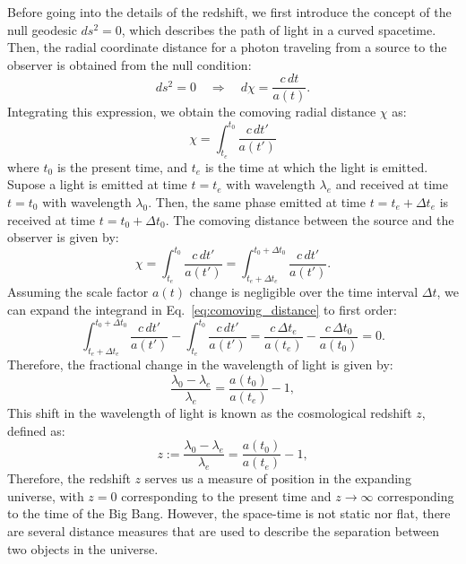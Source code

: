Before going into the details of the redshift, we first introduce the concept of the null geodesic $ds^2 = 0$, which describes the path of light in a curved spacetime. Then, the radial coordinate distance for a photon traveling from a source to the observer is obtained from the null condition:
\begin{equation}
    ds^2 = 0 \quad \Rightarrow \quad d\chi = \frac{c \, dt}{a(t)}.
    \label{eq:null_geodesic_condition}
\end{equation}
Integrating this expression, we obtain the comoving radial distance \( \chi \) as:
\begin{equation}
    \chi = \int_{t_e}^{t_0} \frac{c \, dt'}{a(t')}
    \label{eq:comoving_radial_distance}
\end{equation}
where \( t_0 \) is the present time, and \( t_e \) is the time at which the light is emitted. Supose a light is emitted at time \( t = t_e \) with wavelength \( \lambda_e \) and received at time \( t = t_0 \) with wavelength \( \lambda_0 \). Then, the same phase emitted at time \( t = t_e + \Delta t_e \) is received at time \( t = t_0 + \Delta t_0 \).
The comoving distance between the source and the observer is given by:
\begin{equation}
    \chi = \int_{t_e}^{t_0} \frac{c \, dt'}{a(t')} = \int_{t_e + \Delta t_e}^{t_0 + \Delta t_0} \frac{c \, dt'}{a(t')}.
    \label{eq:comoving_distance}
\end{equation}
Assuming the scale factor \( a(t) \) change is negligible over the time interval \( \Delta t \), we can expand the integrand in Eq.~\eqref{eq:comoving_distance} to first order:
\begin{equation}
    \int_{t_e + \Delta t_e}^{t_0 + \Delta t_0} \frac{c \, dt'}{a(t')} - \int_{t_e}^{t_0} \frac{c \, dt'}{a(t')} = \frac{c \, \Delta t_e}{a(t_e)} - \frac{c \, \Delta t_0}{a(t_0)} = 0.
\end{equation}
Therefore, the fractional change in the wavelength of light is given by:
\begin{equation}
    \frac{\lambda_0 - \lambda_e}{\lambda_e} = \frac{a(t_0)}{a(t_e)} - 1,
    \label{eq:redshift_definition}
\end{equation}
This shift in the wavelength of light is known as the cosmological redshift \( z \), defined as:
\begin{equation}
    z := \frac{\lambda_0 - \lambda_e}{\lambda_e} = \frac{a(t_0)}{a(t_e)} - 1,
    \label{eq:redshift_definition_2}
\end{equation}
Therefore, the redshift $z$ serves us a measure of position in the expanding universe, with $z = 0$ corresponding to the present time and $z \to \infty$ corresponding to the time of the Big Bang. However, the space-time is not static nor flat, there are several distance measures that are used to describe the separation between two objects in the universe. 
